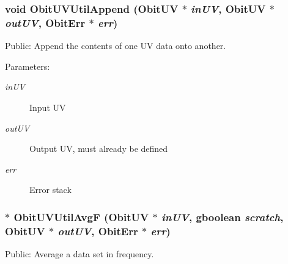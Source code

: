 \subsubsection{\setlength{\rightskip}{0pt plus 5cm}void Obit\-UVUtil\-Append ({\bf Obit\-UV} $\ast$ {\em in\-UV}, {\bf Obit\-UV} $\ast$ {\em out\-UV}, {\bf Obit\-Err} $\ast$ {\em err})}\label{ObitUVUtil_8c_a19}


Public: Append the contents of one UV data onto another. 

\begin{Desc}
\item[Parameters:]
\begin{description}
\item[{\em in\-UV}]Input UV \item[{\em out\-UV}]Output UV, must already be defined \item[{\em err}]Error stack \end{description}
\end{Desc}
\subsubsection{$\ast$ Obit\-UVUtil\-Avg\-F ({\bf Obit\-UV} $\ast$ {\em in\-UV}, gboolean {\em scratch}, {\bf Obit\-UV} $\ast$ {\em out\-UV}, {\bf Obit\-Err} $\ast$ {\em err})}\label{ObitUVUtil_8c_a11}


Public: Average a data set in frequency. 


